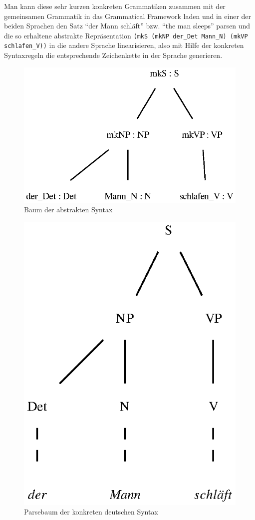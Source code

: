 Man kann diese sehr kurzen konkreten Grammatiken zusammen mit der gemeinsamen Grammatik in das Grammatical Framework laden und in einer der beiden Sprachen den Satz "`der Mann schläft"' bzw. "`the man sleeps"' parsen und die so erhaltene abstrakte Repräsentation \texttt{(mkS (mkNP der\_Det Mann\_N) (mkVP schlafen\_V))} in die andere Sprache linearisieren, also mit Hilfe der konkreten Syntaxregeln die entsprechende Zeichenkette in der Sprache generieren. \par
\begin{figure}
\includegraphics{graphics/MiniSatzTree.eps}
\caption{Baum der abstrakten Syntax}\label{MiniSatz-AbsTree}
\end{figure}
\begin{figure}
\includegraphics{graphics/MiniSatzParseGer.eps}
\caption{Parsebaum der konkreten deutschen Syntax}\label{MiniSatz-ParseGer}
\end{figure}
